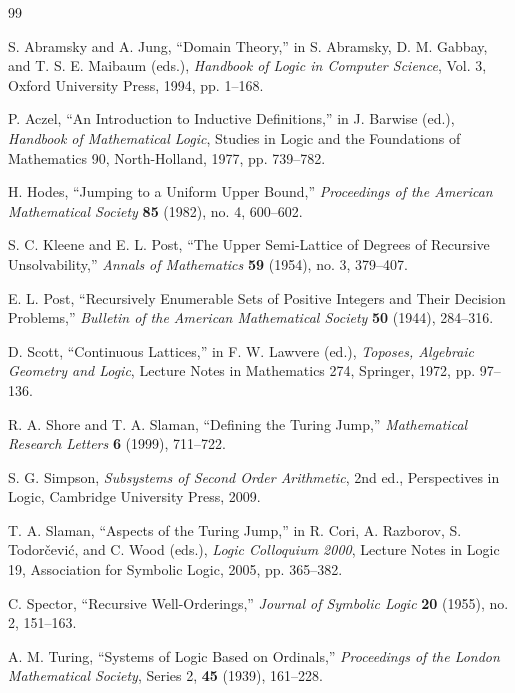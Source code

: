 \documentclass[11pt]{article}
\theoremstyle{definition}
\theoremstyle{remark}
\begin{document}
\begin{thebibliography}{99}

S. Abramsky and A. Jung,
``Domain Theory,''
in S. Abramsky, D. M. Gabbay, and T. S. E. Maibaum (eds.),
\emph{Handbook of Logic in Computer Science}, Vol. 3,
Oxford University Press, 1994, pp. 1--168.

P. Aczel,
``An Introduction to Inductive Definitions,''
in J. Barwise (ed.),
\emph{Handbook of Mathematical Logic},
Studies in Logic and the Foundations of Mathematics 90,
North-Holland, 1977, pp. 739--782.

H. Hodes,
``Jumping to a Uniform Upper Bound,''
\emph{Proceedings of the American Mathematical Society}
\textbf{85} (1982), no. 4, 600--602.

S. C. Kleene and E. L. Post,
``The Upper Semi-Lattice of Degrees of Recursive Unsolvability,''
\emph{Annals of Mathematics}
\textbf{59} (1954), no. 3, 379--407.

E. L. Post,
``Recursively Enumerable Sets of Positive Integers and Their Decision Problems,''
\emph{Bulletin of the American Mathematical Society}
\textbf{50} (1944), 284--316.

D. Scott,
``Continuous Lattices,''
in F. W. Lawvere (ed.),
\emph{Toposes, Algebraic Geometry and Logic},
Lecture Notes in Mathematics 274,
Springer, 1972, pp. 97--136.

R. A. Shore and T. A. Slaman,
``Defining the Turing Jump,''
\emph{Mathematical Research Letters}
\textbf{6} (1999), 711--722.

S. G. Simpson,
\emph{Subsystems of Second Order Arithmetic},
2nd ed.,
Perspectives in Logic,
Cambridge University Press, 2009.

T. A. Slaman,
``Aspects of the Turing Jump,''
in R. Cori, A. Razborov, S. Todor\v{c}evi\'c, and C. Wood (eds.),
\emph{Logic Colloquium 2000},
Lecture Notes in Logic 19,
Association for Symbolic Logic, 2005, pp. 365--382.

C. Spector,
``Recursive Well-Orderings,''
\emph{Journal of Symbolic Logic}
\textbf{20} (1955), no. 2, 151--163.

A. M. Turing,
``Systems of Logic Based on Ordinals,''
\emph{Proceedings of the London Mathematical Society}, Series 2,
\textbf{45} (1939), 161--228.

\end{thebibliography}
\end{document}
